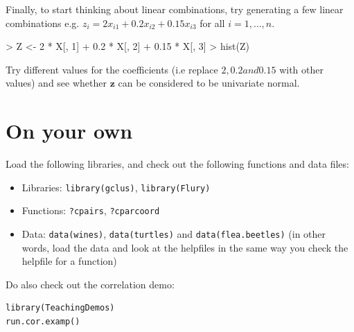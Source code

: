 \documentclass[11pt]{article}
\begin{document}
Finally, to start thinking about linear combinations, try generating a few linear combinations e.g. $z_{i} = 2x_{i1}+0.2x_{i2}+0.15x_{i3}$ for all $i = 1, \ldots, n$.

\begin{Schunk}
\begin{Sinput}
> Z <- 2 * X[, 1] + 0.2 * X[, 2] + 0.15 * X[, 3]
> hist(Z)
\end{Sinput}
\end{Schunk}

Try different values for the coefficients (i.e replace $2, 0.2 and 0.15$ with other values) and see whether $\boldsymbol{z}$ can be considered to be univariate normal.


\section{On your own}

Load the following libraries, and check out the following functions and data files:   

\begin{itemize}
\item Libraries: \texttt{library(gclus)}, \texttt{library(Flury)}
\item Functions: \texttt{?cpairs}, \texttt{?cparcoord} 
\item Data: \texttt{data(wines)}, \texttt{data(turtles)} and \texttt{data(flea.beetles)} (in other words, load the data and look at the helpfiles in the same way you check the helpfile for a function)
\end{itemize}



Do also check out the correlation demo:

\begin{verbatim}
library(TeachingDemos)
run.cor.examp()
\end{verbatim}
\end{document}
